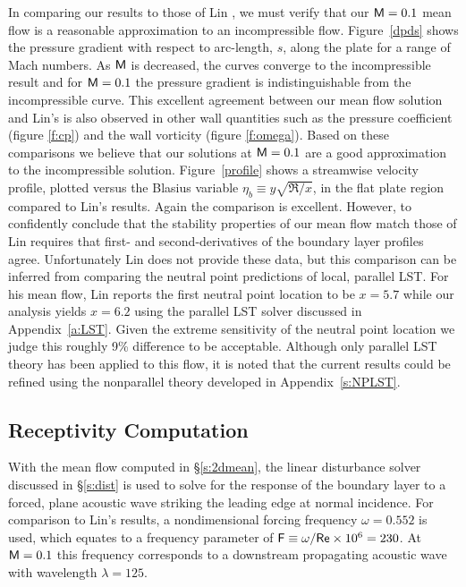In comparing our results to those of Lin \cite{Lin:92}, we must verify that
our ${\sf M}=0.1$ mean flow is a reasonable approximation to an incompressible
flow.  Figure~\ref{dpds} shows the pressure gradient with respect to
arc-length, $s$, along the plate for a range of Mach numbers.  As ${\sf M}$ is
decreased, the curves converge to the incompressible result \cite{Lin:92} and
for ${\sf M}=0.1$ the pressure gradient is indistinguishable from the
incompressible curve.  This excellent agreement between our mean flow solution
and Lin's \cite{Lin:92} is also observed in other wall quantities such as the
pressure coefficient (figure \ref{f:cp}) and the wall vorticity (figure
\ref{f:omega}).  Based on these comparisons we believe that our solutions at
${\sf M}=0.1$ are a good approximation to the incompressible solution.
Figure~\ref{profile} shows a streamwise velocity profile, plotted versus the
Blasius variable $\eta_b \equiv y\sqrt{\Re/x}$, in the flat plate region
compared to Lin's results.  Again the comparison is excellent.  However, to
confidently conclude that the stability properties of our mean flow match
those of Lin requires that first- and second-derivatives of the boundary layer
profiles agree.  Unfortunately Lin does not provide these data, but this
comparison can be inferred from comparing the neutral point predictions of
local, parallel LST.  For his mean flow, Lin reports the first neutral point
location to be $x=5.7$ while our analysis yields $x=6.2$ using the parallel
LST solver discussed in Appendix~\ref{a:LST}.  Given the extreme sensitivity
of the neutral point location we judge this roughly 9\% difference to be
acceptable.  Although only parallel LST theory has been applied to this flow,
it is noted that the current results could be refined using the nonparallel
theory developed in Appendix~\ref{s:NPLST}.

\subsection{Receptivity Computation \label{s:recep}}

With the mean flow computed in \S\ref{s:2dmean}, the linear disturbance solver
discussed in \S\ref{s:dist} is used to solve for the response of the boundary
layer to a forced, plane acoustic wave striking the leading edge at normal
incidence.  For comparison to Lin's \cite{Lin:92} results, a nondimensional
forcing frequency $\omega=0.552$ is used, which equates to a frequency
parameter of ${\sf F} \equiv \omega / {\sf Re} \times 10^6 = 230$.  At ${\sf M}=0.1$ this
frequency corresponds to a downstream propagating acoustic wave with
wavelength $\lambda=125$.

